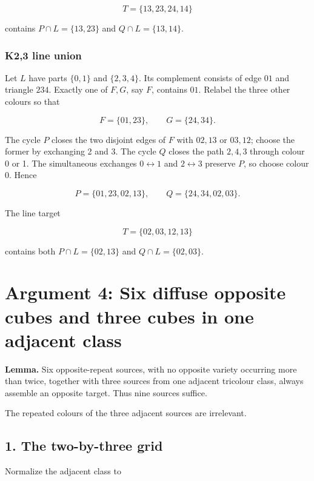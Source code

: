 \documentclass[
  10pt,
]{article}
\begin{document}
\[
T=\{13,23,24,14\}
\]

contains \(P\cap L=\{13,23\}\) and \(Q\cap L=\{13,14\}\).

\hypertarget{k23-line-union}{%
\subsubsection*{K2,3 line union}\label{k23-line-union}}

Let \(L\) have parts \(\{0,1\}\) and \(\{2,3,4\}\). Its complement
consists of edge \(01\) and triangle \(234\). Exactly one of \(F,G\),
say \(F\), contains \(01\). Relabel the three other colours so that

\[
F=\{01,23\},\qquad G=\{24,34\}.
\]

The cycle \(P\) closes the two disjoint edges of \(F\) with \(02,13\) or
\(03,12\); choose the former by exchanging 2 and 3. The cycle \(Q\)
closes the path \(2,4,3\) through colour 0 or 1. The simultaneous
exchanges \(0\leftrightarrow1\) and \(2\leftrightarrow3\) preserve
\(P\), so choose colour 0. Hence

\[
P=\{01,23,02,13\},\qquad
Q=\{24,34,02,03\}.
\]

The line target

\[
T=\{02,03,12,13\}
\]

contains both \(P\cap L=\{02,13\}\) and \(Q\cap L=\{02,03\}\).

\hypertarget{arg-4}{%
\section{Argument 4: Six diffuse opposite cubes and three cubes in one
adjacent class}\label{arg-4}}

\textbf{Lemma.} Six opposite-repeat sources, with no opposite variety
occurring more than twice, together with three sources from one adjacent
tricolour class, always assemble an opposite target. Thus nine sources
suffice.

The repeated colours of the three adjacent sources are irrelevant.

\hypertarget{the-two-by-three-grid}{%
\subsection*{1. The two-by-three grid}\label{the-two-by-three-grid}}

Normalize the adjacent class to
\end{document}
